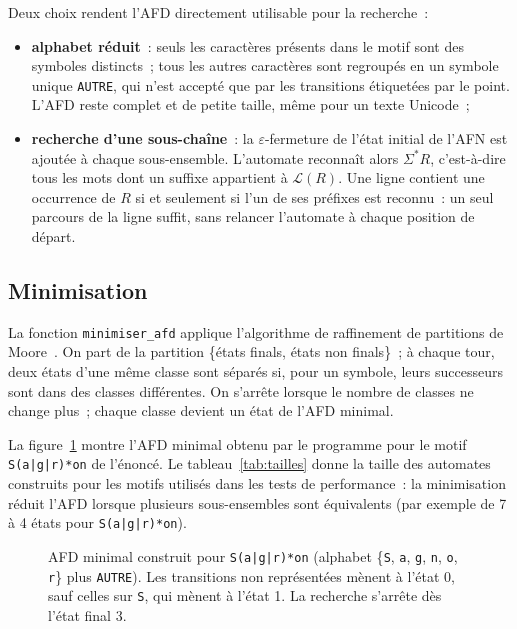 \documentclass[11pt,a4paper]{article}
\begin{document}
Deux choix rendent l'AFD directement utilisable pour la recherche~:
\begin{itemize}
  \item \textbf{alphabet réduit}~: seuls les caractères présents dans le
    motif sont des symboles distincts~; tous les autres caractères sont
    regroupés en un symbole unique \texttt{AUTRE}, qui n'est accepté que par
    les transitions étiquetées par le point. L'AFD reste complet et de petite taille, même
    pour un texte Unicode~;
  \item \textbf{recherche d'une sous-chaîne}~: la $\varepsilon$-fermeture de
    l'état initial de l'AFN est ajoutée à chaque sous-ensemble. L'automate
    reconnaît alors $\Sigma^*R$, c'est-à-dire tous les mots dont un suffixe
    appartient à $\mathcal{L}(R)$. Une ligne contient une occurrence de $R$ si
    et seulement si l'un de ses préfixes est reconnu~: un seul parcours de la
    ligne suffit, sans relancer l'automate à chaque position de départ.
\end{itemize}

\subsection{Minimisation}

La fonction \texttt{minimiser\_afd} applique l'algorithme de raffinement de
partitions de Moore~\cite{Hopcroft2006}. On part de la partition
\{états finals, états non finals\}~; à chaque tour, deux états d'une même classe
sont séparés si, pour un symbole, leurs successeurs sont dans des classes
différentes. On s'arrête lorsque le nombre de classes ne change plus~; chaque
classe devient un état de l'AFD minimal.

La figure~\ref{fig:afd} montre l'AFD minimal obtenu par le programme pour le
motif \texttt{S(a|g|r)*on} de l'énoncé. Le tableau~\ref{tab:tailles} donne la
taille des automates construits pour les motifs utilisés dans les tests de
performance~: la minimisation réduit l'AFD lorsque plusieurs sous-ensembles
sont équivalents (par exemple de 7 à 4 états pour \texttt{S(a|g|r)*on}).

\begin{figure}[ht]
\centering
{}
\caption{AFD minimal construit pour \texttt{S(a|g|r)*on} (alphabet
\{\texttt{S}, \texttt{a}, \texttt{g}, \texttt{n}, \texttt{o}, \texttt{r}\}
plus \texttt{AUTRE}). Les transitions non représentées mènent à l'état 0, sauf
celles sur \texttt{S}, qui mènent à l'état 1. La recherche s'arrête dès
l'état final 3.}
\label{fig:afd}
\end{figure}
\end{document}
